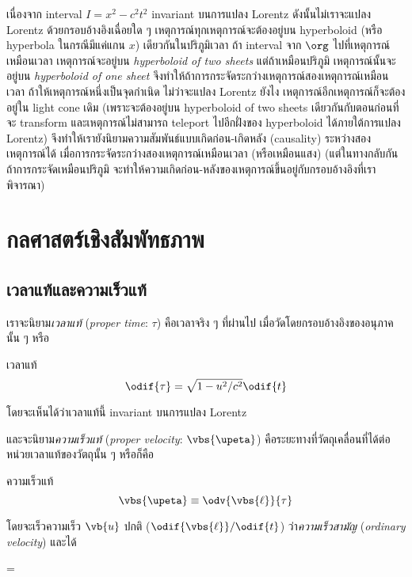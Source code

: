 เนื่องจาก interval $I = x^2 - c^2t^2$ invariant บนการแปลง Lorentz ดังนั้นไม่เราจะแปลง Lorentz ด้วยกรอบอ้างอิงเฉื่อยใด ๆ เหตุการณ์ทุกเหตุการณ์จะต้องอยู่บน hyperboloid (หรือ hyperbola ในกรณีมีแค่แกน $x$) เดียวกันในปริภูมิเวลา ถ้า interval จาก $\org$ ไปที่เหตุการณ์เหมือนเวลา เหตุการณ์จะอยู่บน \emph{hyperboloid of two sheets} แต่ถ้าเหมือนปริภูมิ เหตุการณ์นั้นจะอยู่บน \emph{hyperboloid of one sheet} จึงทำให้ถ้าการกระจัดระกว่างเหตุการณ์สองเหตุการณ์เหมือนเวลา ถ้าให้เหตุการณ์หนึ่งเป็นจุดกำเนิด ไม่ว่าจะแปลง Lorentz ยังไง เหตุการณ์อีกเหตุการณ์ก็จะต้องอยู่ใน light cone เดิม (เพราะจะต้องอยู่บน hyperboloid of two sheets เดียวกันกับตอนก่อนที่จะ transform และเหตุการณ์ไม่สามารถ teleport ไปอีกฝั่งของ hyperboloid ได้ภายใต้การแปลง Lorentz) จึงทำให้เรายังนิยามความสัมพันธ์แบบเกิดก่อน-เกิดหลัง (causality) ระหว่างสองเหตุการณ์ได้ เมื่อการกระจัดระกว่างสองเหตุการณ์เหมือนเวลา (หรือเหมือนแสง) (แต่ในทางกลับกัน ถ้าการกระจัดเหมือนปริภูมิ จะทำให้ความเกิดก่อน-หลังของเหตุการณ์ขึ้นอยู่กับกรอบอ้างอิงที่เราพิจารณา)

\section{กลศาสตร์เชิงสัมพัทธภาพ}

\subsection{เวลาแท้และความเร็วแท้}

เราจะนิยาม\emph{เวลาแท้} (\emph{proper time}: $\tau$) คือเวลาจริง ๆ ที่ผ่านไป เมื่อวัดโดยกรอบอ้างอิงของอนุภาคนั้น ๆ หรือ
\begin{defbox}{เวลาแท้}
    \begin{equation*}
        \odif{\tau} = \sqrt{1 - u^2/c^2}\odif{t}
    \end{equation*}
\end{defbox}
โดยจะเห็นได้ว่าเวลาแท้นี้ invariant บนการแปลง Lorentz

และจะนิยาม\emph{ความเร็วแท้} (\emph{proper velocity}: $\vbs{\upeta}$) คือระยะทางที่วัตถุเคลื่อนที่ได้ต่อหน่วยเวลาแท้ของวัตถุนั้น ๆ หรือก็คือ
\begin{defbox}{ความเร็วแท้}
    \begin{equation*}
        \vbs{\upeta} \equiv \odv{\vbs{\ell}}{\tau}
    \end{equation*}
\end{defbox}
โดยจะเร็วความเร็ว $\vb{u}$ ปกติ ($\odif{\vbs{\ell}}/\odif{t}$) ว่า\emph{ความเร็วสามัญ} (\emph{ordinary velocity}) และได้
\begin{eqnobox}
    \vbs{\upeta} = 
\end{eqnobox}


